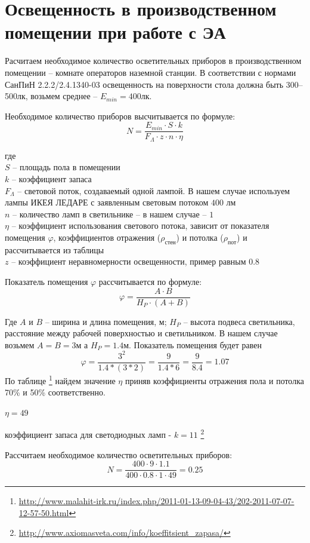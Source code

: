 \documentclass[a4paper,12pt]{report} %
\begin{document}
\section{Освещенность в производственном помещении при работе  с ЭА}

Расчитаем необходимое количество осветительных приборов в производственном
помещении -- комнате операторов наземной станции. В соответствии с нормами СанПиН
2.2.2/2.4.1340-03 освещенность на поверхности стола должна быть 300--500лк,
возьмем среднее -- $E_{min} = 400лк$.

Необходимое количество приборов высчитывается по формуле:
\[
N = \frac{ E_{min} \cdot S \cdot k }{ F_{\Lambda} \cdot z \cdot n \cdot \eta }
\]

где \\
$S$ -- площадь пола в помещении \\
$k$ -- коэффициент запаса \\
$F_{\Lambda}$ -- световой поток, создаваемый одной лампой. В нашем случае
используем лампы ИКЕЯ ЛЕДАРЕ с заявленным световым потоком $400$ лм \\
$n$ -- количество ламп в светильнике -- в нашем случае -- $1$ \\
$\eta$ -- коэффициент использования светового потока, зависит от показателя
помещения $\varphi$, коэффициентов отражения  ($\rho_{\text{стен}}$) и потолка
($\rho_{\text{пот}}$) и рассчитывается из таблицы\\
$z$ -- коэффициент неравномерности освещенности, пример равным $0.8$

Показатель помещения $\varphi$ рассчитывается по формуле:
\[
\varphi = \frac{A \cdot B}{H_{P} \cdot (A + B)}
\]

Где $A$ и $B$ -- ширина и длина помещения, м; $H_{P}$ -- высота подвеса
светильника, расстояние между рабочей поверхностью и светильником. В нашем
случае возьмем $A = B = 3\text{м}$ а $H_{P} = 1.4\text{м}$. Показатель помещения
будет равен 
\[
\varphi = \frac{3^2}{1.4*(3*2)} = \frac{9}{1.4*6} = \frac{9}{8.4} = 1.07
\]
По таблице
\footnote{\url{http://www.malahit-irk.ru/index.php/2011-01-13-09-04-43/202-2011-07-07-12-57-50.html}} 
найдем значение $\eta$ приняв коэффициенты отражения пола и потолка 70\% и 50\%
соответственно.

$\eta = 49$

коэффициент запаса для светодиодных ламп - $k = 11$
\footnote{\url{http://www.axiomasveta.com/info/koeffitsient_zapasa/}} 

Рассчитаем необходимое количество осветительных приборов:
\[
N = \frac{ 400 \cdot 9 \cdot 1.1 }{ 400 \cdot 0.8 \cdot 1 \cdot 49 } = 0.25
\]
\end{document}
